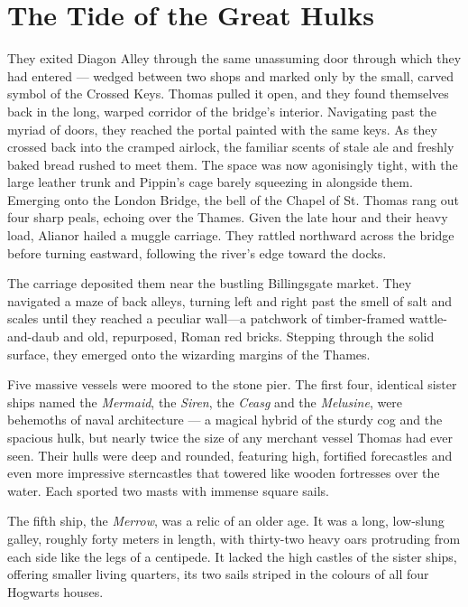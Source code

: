 
\chapter{The Tide of the Great Hulks}

They exited Diagon Alley through the same unassuming door through which they had entered — wedged between two shops and marked only by the small, carved symbol of the Crossed Keys. Thomas pulled it open, and they found themselves back in the long, warped corridor of the bridge's interior. Navigating past the myriad of doors, they reached the portal painted with the same keys. As they crossed back into the cramped airlock, the familiar scents of stale ale and freshly baked bread rushed to meet them. The space was now agonisingly tight, with the large leather trunk and Pippin's cage barely squeezing in alongside them. Emerging onto the London Bridge, the bell of the Chapel of St. Thomas rang out four sharp peals, echoing over the Thames. Given the late hour and their heavy load, Alianor hailed a muggle carriage. They rattled northward across the bridge before turning eastward, following the river's edge toward the docks.

The carriage deposited them near the bustling Billingsgate market. They navigated a maze of back alleys, turning left and right past the smell of salt and scales until they reached a peculiar wall---a patchwork of timber-framed wattle-and-daub and old, repurposed, Roman red bricks. Stepping through the solid surface, they emerged onto the wizarding margins of the Thames.

Five massive vessels were moored to the stone pier. The first four, identical sister ships named the \textit{Mermaid}, the \textit{Siren}, the \textit{Ceasg} and the \textit{Melusine}, were behemoths of naval architecture --- a magical hybrid of the sturdy cog and the spacious hulk, but nearly twice the size of any merchant vessel Thomas had ever seen. Their hulls were deep and rounded, featuring high, fortified forecastles and even more impressive sterncastles that towered like wooden fortresses over the water. Each sported two masts with immense square sails.

The fifth ship, the \textit{Merrow}, was a relic of an older age. It was a long, low-slung galley, roughly forty meters in length, with thirty-two heavy oars protruding from each side like the legs of a centipede. It lacked the high castles of the sister ships, offering smaller living quarters, its two sails striped in the colours of all four Hogwarts houses.

